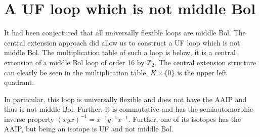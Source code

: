 \documentclass[12pt, twoside, openright]{report}
\theoremstyle{definition}
\newcommand{\ZZZ}{\mathbb{Z}}
\begin{document}
\section{A UF loop which is not middle Bol}

It had been conjectured that all universally flexible loops are middle Bol. The central extension
  approach did allow us to construct a UF loop which is not middle Bol. The multiplication table
  of such a loop is below, it is a central extension of a middle Bol loop of order 16 by $\ZZZ_2$.
  The central extension structure can clearly be seen in the multiplication table, $K\times \{0\}$
  is the upper left quadrant.

In particular, this loop is universally flexible and does not have the AAIP and thus is not middle Bol.
  Further, it is commutative and has the semiautomorphic inverse property
  $(xyx)^{-1} = x^{-1} y^{-1} x^{-1}$. Further, one of its isotopes has the AAIP, but being an isotope
  is UF and not middle Bol.
\end{document}
